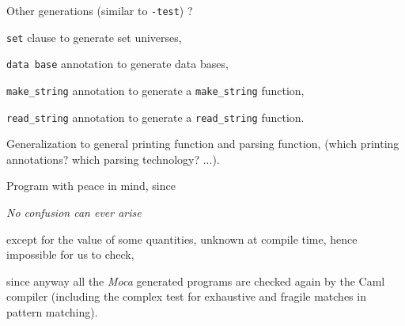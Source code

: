 
\begin{citemize}
  \item Other generations (similar to {\tt -test}) ?
     \begin{citemize}
        \item {\tt set} clause to generate set universes,
        \item {\tt data base} annotation to generate data bases,
        \item {\tt make\_string} annotation to generate a {\tt make\_string}
     function,
        \item {\tt read\_string} annotation to generate a {\tt read\_string} function.
     \end{citemize}
  \item Generalization to general printing function and parsing function,
        (which printing annotations? which parsing technology? ...).
\end{citemize}


Program with peace in mind, since

\centerline{\em No confusion can ever arise}

\begin{citemize}
 \item except for the value of some quantities, unknown at compile time,
 hence impossible for us to check,
 \item since anyway all the {\em Moca} generated programs are checked again by the Caml
 compiler (including the complex test for exhaustive and fragile matches in pattern matching).
\end{citemize}
